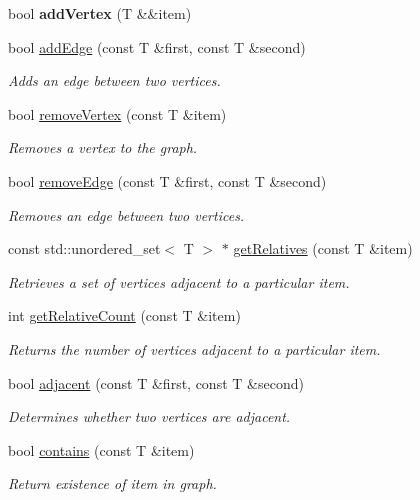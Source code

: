 \begin{DoxyCompactItemize}
bool {\bfseries add\+Vertex} (T \&\&item)
\item 
bool \hyperlink{class_graph_ae68a4a6bcb5dacf54f389ec9f28eb9e7}{add\+Edge} (const T \&first, const T \&second)
\begin{DoxyCompactList}\small\item\em Adds an edge between two vertices. \end{DoxyCompactList}\item 
bool \hyperlink{class_graph_ab60cdf74dfbd8c7682b760338fb8a952}{remove\+Vertex} (const T \&item)
\begin{DoxyCompactList}\small\item\em Removes a vertex to the graph. \end{DoxyCompactList}\item 
bool \hyperlink{class_graph_afec0f8270f77a9b54f6528a4e7182c84}{remove\+Edge} (const T \&first, const T \&second)
\begin{DoxyCompactList}\small\item\em Removes an edge between two vertices. \end{DoxyCompactList}\item 
const std\+::unordered\+\_\+set$<$ T $>$ $\ast$ \hyperlink{class_graph_add90c1bc37771d0bf57515fd30d4c6c4}{get\+Relatives} (const T \&item)
\begin{DoxyCompactList}\small\item\em Retrieves a set of vertices adjacent to a particular item. \end{DoxyCompactList}\item 
int \hyperlink{class_graph_aaab69d9804f13918c7fe260b86a40d91}{get\+Relative\+Count} (const T \&item)
\begin{DoxyCompactList}\small\item\em Returns the number of vertices adjacent to a particular item. \end{DoxyCompactList}\item 
bool \hyperlink{class_graph_adb8fbcba5e10315bba9e60080d4bac50}{adjacent} (const T \&first, const T \&second)
\begin{DoxyCompactList}\small\item\em Determines whether two vertices are adjacent. \end{DoxyCompactList}\item 
bool \hyperlink{class_graph_a9e88e1fec0b85da66ea58a39a4fdc652}{contains} (const T \&item)
\begin{DoxyCompactList}\small\item\em Return existence of item in graph. \end{DoxyCompactList}\item 

\end{DoxyCompactItemize}
